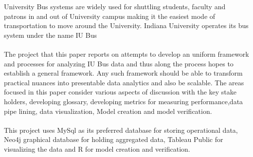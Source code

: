 \documentclass[12pt]{article}\usepackage[]{graphicx}\usepackage[]{color}
\renewenvironment{abstract}
 {\small
  \begin{center}
  \bfseries \abstractname\vspace{-.5em}\vspace{0pt}
  \end{center}
  \list{}{
    \setlength{\leftmargin}{.5cm}%
    \setlength{\rightmargin}{\leftmargin}%
  }%
  \item\relax}
 {\endlist}
\begin{document}
\begin{abstract}
University Bus systems are widely used for shuttling students, faculty and patrons in and out of University campus making it the easiest mode of transportation to move around the University. Indiana University operates its bus system under the name IU Bus\cite{1} \\ \\
The project that this paper reports on attempts to develop an uniform framework and processes for analyzing IU Bus data and thus along the process hopes to establish a general framework. Any such framework should be able to transform practical nuances into presentable data analytics and also be scalable. The areas focused in this paper consider various aspects of discussion with the key stake holders, developing glossary, developing metrics for measuring performance,data pipe lining, data visualization, Model creation and model verification.\\ \\
This project uses MySql as its preferred database for storing operational data, Neo4j graphical database for holding aggregated data, Tableau Public for visualizing the data and R for model creation and verification.
\end{abstract}

\clearpage

\tableofcontents
\clearpage
\end{document}

